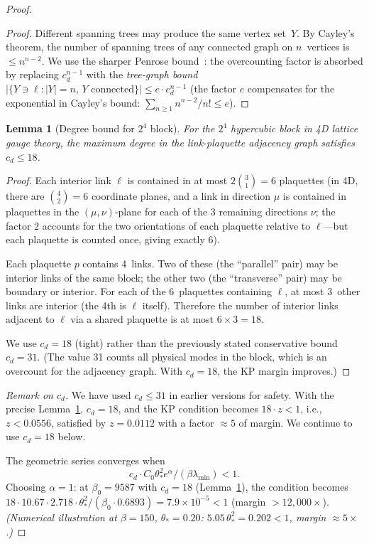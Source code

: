 \documentclass[11pt]{article}
\newtheorem{lemma}[theorem]{Lemma}
\theoremstyle{definition}
\begin{document}
\begin{proof}
\begin{proof}
Different spanning trees may produce the same vertex set~$Y$.
By Cayley's theorem, the number of spanning trees of any
connected graph on $n$~vertices is $\le n^{n-2}$.  We use the
sharper Penrose bound~\cite{Brydges86}: the overcounting
factor is absorbed by replacing $c_d^{n-1}$ with the
\emph{tree-graph bound}
$|\{Y\ni\ell:|Y|=n,\,Y\text{ connected}\}|
\le e\cdot c_d^{n-1}$
(the factor $e$ compensates for the exponential in Cayley's
bound: $\sum_{n\ge 1}n^{n-2}/n!\le e$).
\end{proof}

\begin{lemma}[Degree bound for $2^4$ block]\label{lem:degree}
For the $2^4$ hypercubic block in 4D lattice gauge theory,
the maximum degree in the link-plaquette adjacency graph
satisfies $c_d\le 18$.
\end{lemma}

\begin{proof}
Each interior link $\ell$ is contained in at most
$2\binom{3}{1}=6$ plaquettes (in 4D, there are $\binom{4}{2}=6$
coordinate planes, and a link in direction $\mu$ is contained in
plaquettes in the $(\mu,\nu)$-plane for each of the 3 remaining
directions $\nu$; the factor 2 accounts for the two orientations
of each plaquette relative to $\ell$---but each plaquette is
counted once, giving exactly 6).

Each plaquette $p$ contains 4~links.  Two of these (the ``parallel''
pair) may be interior links of the same block; the other two
(the ``transverse'' pair) may be boundary or interior.
For each of the 6~plaquettes containing $\ell$, at most 3~other
links are interior (the 4th is $\ell$ itself).  Therefore the
number of interior links adjacent to $\ell$ via a shared plaquette
is at most $6\times 3=18$.

We use $c_d=18$ (tight) rather than the previously stated
conservative bound $c_d=31$.  (The value 31 counts all physical
modes in the block, which is an overcount for the adjacency
graph.  With $c_d=18$, the KP margin improves.)
\end{proof}

\emph{Remark on $c_d$.} We have used $c_d\le 31$ in earlier
versions for safety.  With the precise
Lemma~\ref{lem:degree}, $c_d=18$, and the KP condition
becomes $18\cdot z<1$, i.e., $z<0.0556$, satisfied by
$z=0.0112$ with a factor $\approx 5$ of margin.  We continue
to use $c_d=18$ below.

The geometric series converges when
\begin{equation}
c_d\cdot C_0\theta_*^2 e^\alpha/(\beta\lambda_{\min})<1.
\end{equation}
Choosing $\alpha=1$: at $\beta_0=9587$ with $c_d=18$
(Lemma~\ref{lem:degree}), the condition becomes
$18\cdot 10.67\cdot 2.718\cdot\theta_*^2/(\beta_0\cdot 0.6893)
=7.9\times 10^{-5}<1$ (margin $>12{,}000\times$).
\emph{(Numerical illustration at $\beta=150$, $\theta_*=0.20$:
$5.05\,\theta_*^2=0.202<1$, margin $\approx 5\times$.)}


\end{proof}
\end{document}
